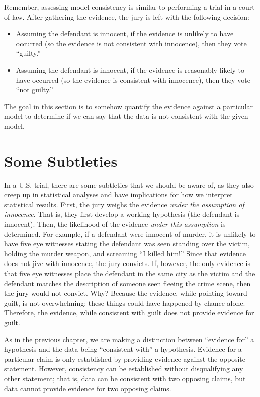 \documentclass[]{book}
\providecommand{\tightlist}{%
  \setlength{\itemsep}{0pt}\setlength{\parskip}{0pt}}
\theoremstyle{plain}
\theoremstyle{mydefn}
\theoremstyle{myexmpl}
\theoremstyle{remark}
\begin{document}
Remember, assessing model consistency is similar to performing a trial
in a court of law. After gathering the evidence, the jury is left with
the following decision:

\begin{itemize}
\tightlist
\item
  Assuming the defendant is innocent, if the evidence is unlikely to
  have occurred (so the evidence is not consistent with innocence), then
  they vote ``guilty.''
\item
  Assuming the defendant is innocent, if the evidence is reasonably
  likely to have occurred (so the evidence is consistent with
  innocence), then they vote ``not guilty.''
\end{itemize}

The goal in this section is to somehow quantify the evidence against a
particular model to determine if we can say that the data is not
consistent with the given model.

\section{Some Subtleties}\label{some-subtleties}

In a U.S. trial, there are some subtleties that we should be aware of,
as they also creep up in statistical analyses and have implications for
how we interpret statistical results. First, the jury weighs the
evidence \emph{under the assumption of innocence}. That is, they first
develop a working hypothesis (the defendant is innocent). Then, the
likelihood of the evidence \emph{under this assumption} is determined.
For example, if a defendant were innocent of murder, it is unlikely to
have five eye witnesses stating the defendant was seen standing over the
victim, holding the murder weapon, and screaming ``I killed him!'' Since
that evidence does not jive with innocence, the jury convicts. If,
however, the only evidence is that five eye witnesses place the
defendant in the same city as the victim and the defendant matches the
description of someone seen fleeing the crime scene, then the jury would
not convict. Why? Because the evidence, while pointing toward guilt, is
not overwhelming; these things could have happened by chance alone.
Therefore, the evidence, while consistent with guilt does not provide
evidence for guilt.

As in the previous chapter, we are making a distinction between
``evidence for'' a hypothesis and the data being ``consistent with'' a
hypothesis. Evidence for a particular claim is only established by
providing evidence against the opposite statement. However, consistency
can be established without disqualifying any other statement; that is,
data can be consistent with two opposing claims, but data cannot provide
evidence for two opposing claims.
\end{document}
